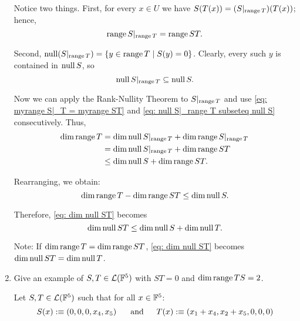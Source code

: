 \begin{xrcs}
\begin{enumerate}
{\begin{xprf}
      Notice two things. First, for every $x \in U$ we have $S(T(x)) = (S|_{\operatorname{range} T}) (T(x))$; hence,
      \begin{equation}
        \label{eq: myrange S|_T = myrange ST}
        \operatorname{range} S|_{\operatorname{range} T} = \operatorname{range} ST.
      \end{equation}

      Second, $\operatorname{null} (S|_{\operatorname{range} T}) = \{ y \in \operatorname{range} T \mid S(y) = 0 \}$. Clearly, every such $y$ is contained in $\operatorname{null} S$, so
      \begin{equation}
        \label{eq: null S|_range T subseteq null S}
        \operatorname{null} S|_{\operatorname{range} T} \subseteq \operatorname{null} S.
      \end{equation}

      Now we can apply the Rank-Nullity Theorem to $S|_{\operatorname{range} T}$ and use \eqref{eq: myrange S|_T = myrange ST} and \eqref{eq: null S|_range T subseteq null S} consecutively. Thus,
      \begin{equation}
        \begin{aligned}
          \dim \operatorname{range} T & =    \dim \operatorname{null} S|_{\operatorname{range} T} + \dim \operatorname{range} S|_{\operatorname{range} T} \\
                          & =    \dim \operatorname{null} S|_{\operatorname{range} T} + \dim \operatorname{range} ST \\
                          & \leq \dim \operatorname{null} S + \dim \operatorname{range} ST.
        \end{aligned}
      \end{equation}

      Rearranging, we obtain:
      \begin{equation}
        \dim \operatorname{range} T - \dim \operatorname{range} ST \leq \dim \operatorname{null} S.
      \end{equation}

      Therefore, \eqref{eq: dim null ST} becomes
      \begin{equation}
        \dim \operatorname{null} ST \leq \dim \operatorname{null} S + \dim \operatorname{null} T.
      \end{equation}

      Note: If $\dim \operatorname{range} T = \dim \operatorname{range} ST$, \eqref{eq: dim null ST} becomes $\dim \operatorname{null} ST = \dim \operatorname{null} T$.
    \end{xprf}
    }
    \item{
      Give an example of $S, T \in \mathcal{L}(\mathbb{F}^5)$ with $ST = 0$ and $\dim \operatorname{range} TS = 2$.

      Let $S, T \in \mathcal{L}(\mathbb{F}^5)$ such that for all $x \in \mathbb{F}^5$:
      \begin{equation}
        S(x) :\equiv (0,0,0,x_4,x_5) \quad \;\;\, \text{and}\;\; \quad T(x) :\equiv (x_1 + x_4, x_2 + x_5, 0,0,0)
      \end{equation}

}
\end{enumerate}
\end{xrcs}
